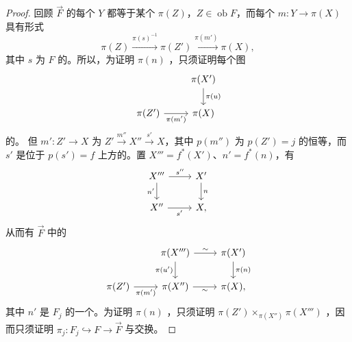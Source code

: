 \begin{proof}
回顾 $\overrightarrow F$ 的每个 $Y$ 都等于某个 $\pi(Z)$，$Z\in\operatorname{ob}F$，而每个 $m:Y\to\pi(X)$ 具有形式
\[\pi(Z)\xrightarrow{\pi(s)^{-1}}\pi(Z')\xrightarrow{\pi(m')}\pi(X),\]
其中 $s$ 为 $F$ 的。所以，为证明 $\pi(n)$ ，只须证明每个图
\[\begin{tikzcd}
&\pi(X')\arrow[d,"\pi(u)"]\\
\pi(Z')\arrow[r,"\pi(m')"']&\pi(X)
\end{tikzcd}\]
的。
但 $m':Z'\to X$ 为 $Z'\xrightarrow{m''}X''\xrightarrow{s'}X$，其中 $p(m'')$ 为 $p(Z')=j$ 的恒等，而 $s'$ 是位于 $p(s')=f$ 上方的。置 $X'''=f^*(X')$、$n'=f^*(n)$，有
\[\begin{tikzcd}
X'''\arrow[r,"s''"]\arrow[d,"n'"']&X'\arrow[d,"n"]\\
X''\arrow[r,"s'"']&X,
\end{tikzcd}\]
从而有 $\overrightarrow F$ 中的
\[\begin{tikzcd}
&\pi(X''')\arrow[r,"\sim"]\arrow[d,"\pi(u')"']&\pi(X')\arrow[d,"\pi(n)"]\\
\pi(Z')\arrow[r,"\pi(m')"']&\pi(X'')\arrow[r,"\sim"']&\pi(X),
\end{tikzcd}\]
其中 $n'$ 是 $F_j$ 的一个。为证明 $\pi(n)$ ，只须证明 $\pi(Z')\times_{\pi(X'')}\pi(X''')$ ，因而只须证明 $\pi_j:F_j\hookrightarrow F\to\overrightarrow F$ 与交换。


\end{proof}
